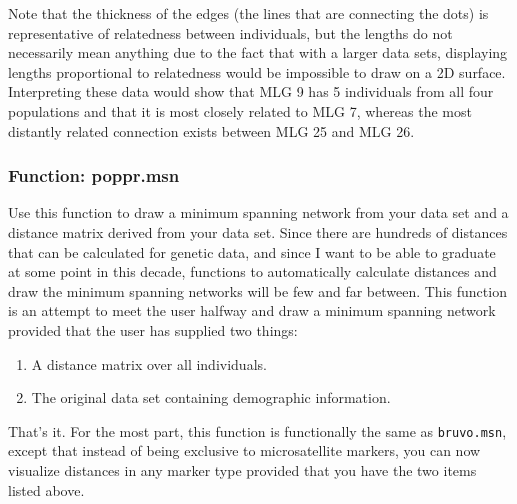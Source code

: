 \documentclass[letterpaper]{article}
\newcommand{\tab}{\hspace*{1em}}
\begin{document}
Note that the thickness of the edges (the lines that are connecting the dots) is representative of relatedness between individuals, but the lengths do not necessarily mean anything due to the fact that with a larger data sets, displaying lengths proportional to relatedness would be impossible to draw on a 2D surface. Interpreting these data would show that MLG 9 has 5 individuals from all four populations and that it is most closely related to MLG 7, whereas the most distantly related connection exists between MLG 25 and MLG 26.
\newpage
\subsubsection{Function: poppr.msn}\label{index:trees:poppr.msn}

\tab\tab Use this function to draw a minimum spanning network from your data set and a distance matrix derived from your data set. Since there are hundreds of distances that can be calculated for genetic data, and since I want to be able to graduate at some point in this decade, functions to automatically calculate distances and draw the minimum spanning networks will be few and far between. This function is an attempt to meet the user halfway and draw a minimum spanning network provided that the user has supplied two things:
\begin{enumerate}
  \item A distance matrix over all individuals.
  \item The original data set containing demographic information.
\end{enumerate}

That's it. For the most part, this function is functionally the same as \texttt{bruvo.msn}, except that instead of being exclusive to microsatellite markers, you can now visualize distances in any marker type provided that you have the two items listed above.
\end{document}
